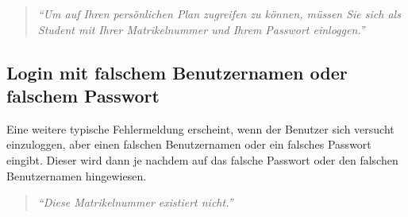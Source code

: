 \documentclass[a4paper,10pt]{scrartcl}
\begin{document}
\begin{quote}
\emph{``Um auf Ihren persönlichen Plan zugreifen zu können, müssen Sie sich als Student mit Ihrer Matrikelnummer und Ihrem Passwort einloggen.''}
\end{quote} 

 \noindent{}


\subsection{Login mit falschem Benutzernamen oder falschem Passwort}

Eine weitere typische Fehlermeldung erscheint, wenn der Benutzer sich versucht einzuloggen, aber einen falschen Benutzernamen oder ein falsches Passwort eingibt.
Dieser wird dann je nachdem auf das falsche Passwort oder den falschen Benutzernamen hingewiesen.

\begin{quote}
\emph{``Diese Matrikelnummer existiert nicht.''}
\end{quote} 

 \noindent{}
\medskip
\end{document}
